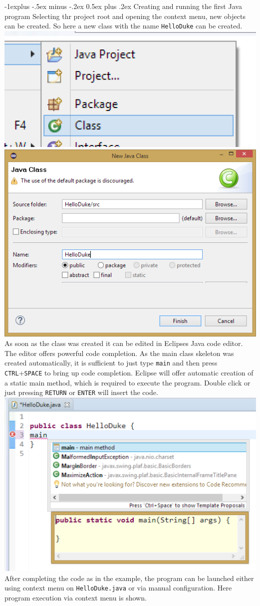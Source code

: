 \documentclass[10pt,landscape,a4paper]{article}
\makeatletter
\renewcommand{\subsection}{\@startsection{subsection}{2}{0mm}%
                                {-1explus -.5ex minus -.2ex}%
                                {0.5ex plus .2ex}%
                                {\normalfont\normalsize\bfseries}}
\makeatother
\begin{document}
\begin{multicols}{2}
\subsection{Creating and running the first Java program}
Selecting thr project root and opening the context menu, new objects can be created. So here a new class with the name \texttt{HelloDuke} can be created.\\
\includegraphics[width=.3\linewidth]{../slides/ContextMenu_CreateClass.png} 
\includegraphics[width=.5\linewidth]{../slides/EclipseProjectExplorerNewClass2.png}\\
As soon as the class was created it can be edited in Eclipses Java code editor. The editor offers powerful code completion. As the main class skeleton was created automatically, it is sufficient to just type \texttt{main} and then press \texttt{CTRL}+\texttt{SPACE} to bring up code completion. Eclipse will offer automatic creation of a static main method, which is required to execute the program. Double click or just pressing \texttt{RETURN} or \texttt{ENTER} will insert the code.\\
\includegraphics[width=.5\linewidth]{../slides/CodeCompletion_MainMethod.png}\\
After completing the code as in the example, the program can be launched either using context menu on \texttt{HelloDuke.java} or via manual configuration. Here program execution via context menu is shown.\\

\end{multicols}
\end{document}
